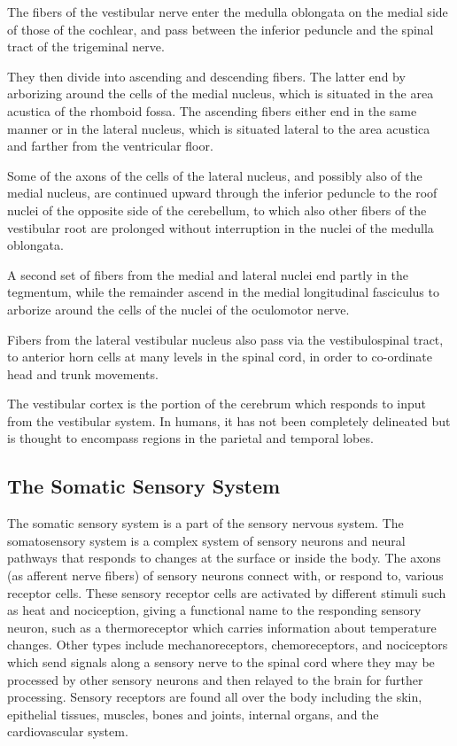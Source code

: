 The fibers of the vestibular nerve enter the medulla oblongata on the
medial side of those of the cochlear, and pass between the inferior
peduncle and the spinal tract of the trigeminal nerve.

They then divide into ascending and descending fibers. The latter end by
arborizing around the cells of the medial nucleus, which is situated in
the area acustica of the rhomboid fossa. The ascending fibers either end
in the same manner or in the lateral nucleus, which is situated lateral
to the area acustica and farther from the ventricular floor.

Some of the axons of the cells of the lateral nucleus, and possibly also
of the medial nucleus, are continued upward through the inferior
peduncle to the roof nuclei of the opposite side of the cerebellum, to
which also other fibers of the vestibular root are prolonged without
interruption in the nuclei of the medulla oblongata.

A second set of fibers from the medial and lateral nuclei end partly in
the tegmentum, while the remainder ascend in the medial longitudinal
fasciculus to arborize around the cells of the nuclei of the oculomotor
nerve.

Fibers from the lateral vestibular nucleus also pass via the
vestibulospinal tract, to anterior horn cells at many levels in the
spinal cord, in order to co-ordinate head and trunk movements.

The vestibular cortex is the portion of the cerebrum which responds to
input from the vestibular system. In humans, it has not been completely
delineated but is thought to encompass regions in the parietal and
temporal lobes.

\hypertarget{the-somatic-sensory-system}{%
\subsection{The Somatic Sensory
System}\label{the-somatic-sensory-system}}

The somatic sensory system is a part of the sensory nervous system. The
somatosensory system is a complex system of sensory neurons and neural
pathways that responds to changes at the surface or inside the body. The
axons (as afferent nerve fibers) of sensory neurons connect with, or
respond to, various receptor cells. These sensory receptor cells are
activated by different stimuli such as heat and nociception, giving a
functional name to the responding sensory neuron, such as a
thermoreceptor which carries information about temperature changes.
Other types include mechanoreceptors, chemoreceptors, and nociceptors
which send signals along a sensory nerve to the spinal cord where they
may be processed by other sensory neurons and then relayed to the brain
for further processing. Sensory receptors are found all over the body
including the skin, epithelial tissues, muscles, bones and joints,
internal organs, and the cardiovascular system.

